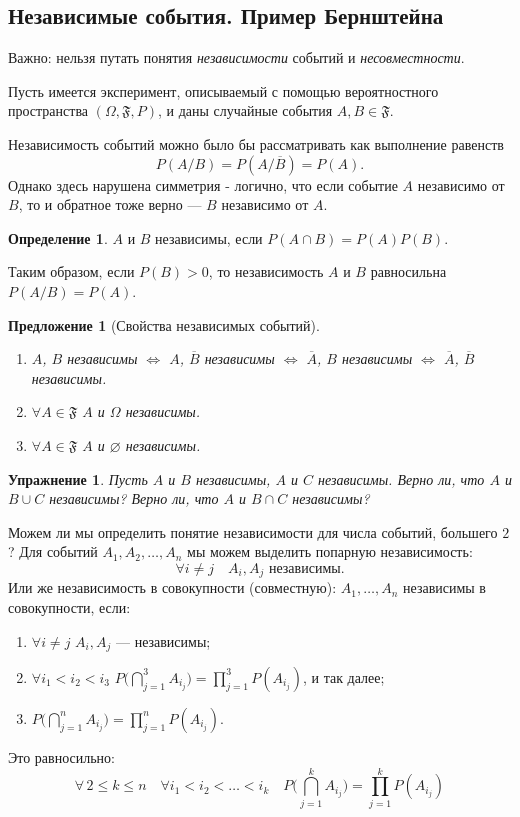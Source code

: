 \documentclass[11pt,openany,a4paper]{scrartcl}
\theoremstyle{plain}
\newtheorem{proposition}[theorem]{Предложение}
\newtheorem{exercise}[theorem]{Упражнение}
\theoremstyle{definition}
\newtheorem{definition}[theorem]{Определение}
\begin{document}
\subsection{Независимые события. Пример Бернштейна}

Важно: нельзя путать понятия \emph{независимости} событий и \emph{несовместности}.

Пусть имеется эксперимент, описываемый с помощью вероятностного пространства
$(\Omega, \mathfrak{F}, P)$, и даны случайные события $A, B \in \mathfrak{F}$.

Независимость событий можно было бы рассматривать как выполнение равенств
$$
P(A/B) = P(A/\overline{B}) = P(A).
$$
Однако здесь нарушена симметрия - логично, что если событие $A$ независимо от $B$, то
и обратное тоже верно — $B$ независимо от $A$.

\begin{definition}
    $A$ и $B$ независимы, если $P(A\cap B) = P(A)P(B)$.
\end{definition}

Таким образом, если $P(B) > 0$, то независимость $A$ и $B$ равносильна
$P(A/B) = P(A)$.
\begin{proposition}[Свойства независимых событий]
    \begin{enumerate}
        \item $A$, $B$ независимы $\iff$ $A$, $\overline{B}$ независимы
        $\iff$ $\overline{A}$, $B$ независимы $\iff$ $\overline{A}$, $\overline{B}$ 
        независимы.
        \item $\forall A \in \mathfrak{F}$ $A$ и $\Omega$ независимы.
        \item $\forall A \in \mathfrak{F}$ $A$ и $\varnothing$ независимы.
    \end{enumerate}
\end{proposition}
\begin{exercise}
    Пусть $A$ и $B$ независимы, $A$ и $C$ независимы. Верно ли, что $A$ и $B \cup C$
    независимы? Верно ли, что $A$ и $B \cap C$ независимы?
\end{exercise}

Можем ли мы определить понятие независимости для числа событий, большего $2$?
Для событий $A_1, A_2, \ldots, A_n$ мы можем выделить попарную независимость:
$$
\forall i\neq j\quad A_i, A_j \text{ независимы.}
$$
Или же независимость в совокупности (совместную): $A_1, \ldots, A_n$ независимы в
совокупности, если:
\begin{enumerate}
    \item $\forall i\neq j$ $A_i, A_j$ — независимы;
    \item $\forall i_1<i_2<i_3$ $P\Big(\bigcap\limits_{j=1}^3 A_{i_j}\Big) =
    \prod\limits_{j=1}^3P(A_{i_j})$, и так далее;
    \item $P\Big(\bigcap\limits_{j=1}^n A_{i_j}\Big) = \prod\limits_{j=1}^n P(A_{i_j})$.
\end{enumerate}
Это равносильно:
$$
\forall\, 2 \leqslant k \leqslant n \quad \forall i_1 < i_2 < \ldots < i_k\quad
P\bigg(\bigcap_{j=1}^k A_{i_j}\bigg) = \prod_{j=1}^k P(A_{i_j})
$$
\end{document}
